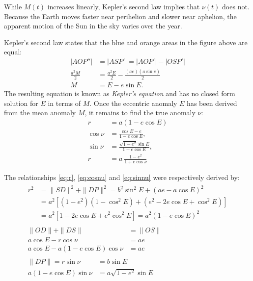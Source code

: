 \documentclass[12pt]{article}
\begin{document}
While $M(t)$ increases linearly, Kepler's second law implies that $\nu(t)$ does not.
Because the Earth moves faster near perihelion and slower near aphelion, 
the apparent motion of the Sun in the sky varies over the year.

Kepler's second law states that the blue and orange areas in the figure above 
are equal:
\begin{align}
    |AOP''| &= |ASP'| = |AOP'| - |OSP'|\\
    \frac{a^2 M}{2} &= \frac{a^2 E}{2} - \frac{(ae) (a\sin e)}{2}\\
    M &= E - e \sin E \label{eq:keplereq}.
\end{align}
The resulting equation is known as \textit{Kepler's equation} and has no closed 
form solution for $E$ in terms of $M$. Once the eccentric anomaly $E$ has been 
derived from the mean anomaly $M$, it remains to find the true anomaly $\nu$:
\begin{align}
    r &= a(1-e \cos E) \label{eq:r}\\[6pt]
    \cos \nu &= \frac{\cos E - e}{1 - e \cos E}, \label{eq:cosnu}\\[0pt]
    \sin \nu &= \frac{\sqrt{1-e^2} \sin E}{1-e\cos E}, \label{eq:sinnu}\\
    r &= a\: \frac{1-e^2}{1+e \cos \nu}
\end{align}

The relationships \eqref{eq:r}, \eqref{eq:cosnu} and \eqref{eq:sinnu} 
were respectively derived by:
\begin{gather}
    \begin{aligned}
        r^2 &= \|SD\|^2+ \|DP\|^2 = b^2 \sin^2 E + (ae - a \cos E)^2\\
        &= a^2 \left[(1-e^2) (1-\cos^2 E) + (e^2 - 2e \cos E + \cos^2 E)\right]\\
        &= a^2 \left[ 1 - 2e \cos E + e^2 \cos^2 E\right] = a^2 (1-e \cos E)^2
    \end{aligned}\\[12pt]
    \begin{aligned}
        \|OD\| + \|DS\| &= \|OS\|\\
        a \cos E - r \cos \nu &= ae\\
        a \cos E - a (1-e \cos E) \cos \nu &= ae
    \end{aligned}\\[12pt]
    \begin{aligned}
        \|DP\| = r \sin \nu &= b \sin E\\
        a(1-e\cos E) \sin \nu &= a\sqrt{1-e^2} \sin E
    \end{aligned}
\end{gather}
\end{document}
